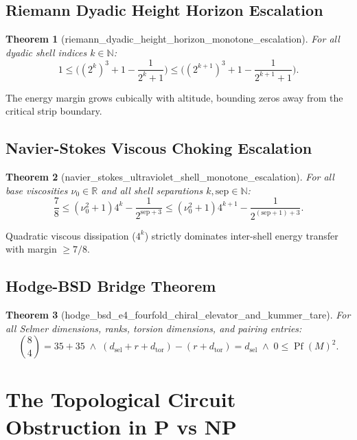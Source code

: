 \documentclass[11pt,a4paper]{article}
\newtheorem{theorem}{Theorem}[section]
\theoremstyle{definition}
\begin{document}
\subsection{Riemann Dyadic Height Horizon Escalation}
\begin{theorem}[riemann\_dyadic\_height\_horizon\_monotone\_escalation]
For all dyadic shell indices $k \in \mathbb{N}$:
\begin{equation}
1 \le \bigl((2^k)^3 + 1 - \frac{1}{2^k + 1}\bigr) \le \bigl((2^{k+1})^3 + 1 - \frac{1}{2^{k+1} + 1}\bigr).
\end{equation}
\end{theorem}
\noindent The energy margin grows cubically with altitude, bounding zeros away from the critical strip boundary.

\subsection{Navier-Stokes Viscous Choking Escalation}
\begin{theorem}[navier\_stokes\_ultraviolet\_shell\_monotone\_escalation]
For all base viscosities $\nu_0 \in \mathbb{R}$ and all shell separations $k, \mathrm{sep} \in \mathbb{N}$:
\begin{equation}
\frac{7}{8} \le (\nu_0^2 + 1) 4^k - \frac{1}{2^{\mathrm{sep}+3}} \le (\nu_0^2 + 1) 4^{k+1} - \frac{1}{2^{(\mathrm{sep}+1)+3}}.
\end{equation}
\end{theorem}
\noindent Quadratic viscous dissipation ($4^k$) strictly dominates inter-shell energy transfer with margin $\ge 7/8$.

\subsection{Hodge-BSD Bridge Theorem}
\begin{theorem}[hodge\_bsd\_e4\_fourfold\_chiral\_elevator\_and\_kummer\_tare]
For all Selmer dimensions, ranks, torsion dimensions, and pairing entries:
\begin{equation}
\binom{8}{4} = 35 + 35 \;\land\; (d_{\mathrm{sel}} + r + d_{\mathrm{tor}}) - (r + d_{\mathrm{tor}}) = d_{\mathrm{sel}} \;\land\; 0 \le \operatorname{Pf}(M)^2.
\end{equation}
\end{theorem}

\section{The Topological Circuit Obstruction in P vs NP}
\end{document}
